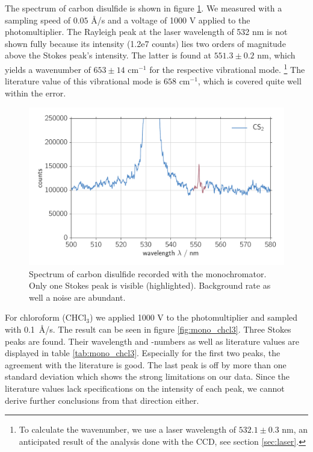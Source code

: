 The spectrum of carbon disulfide is shown in figure \ref{fig:mono_cs2}. We measured with a sampling speed of 
$0.05$ \AA/s and a voltage of 1000 V applied to the photomultiplier. 
The Rayleigh peak at the laser wavelength of 532 nm is not shown fully because its intensity (1.2e7 counts) 
lies two orders of magnitude above the Stokes peak's intensity.
The latter is found at $551.3 \pm 0.2$ nm, which yields a wavenumber of $653 \pm 14 \text{ cm}^{-1}$ for the respective
vibrational mode.%
\footnote{
    To calculate the wavenumber, we use a laser wavelength of $532.1 \pm 0.3$ nm, an anticipated result of the analysis
    done with the CCD, see section \ref{sec:laser}.
} The literature value of this vibrational mode is $658 \text{ cm}^{-1}$, which is covered quite well within the error.   

\begin{figure}[htpb]
    \centering
    \includegraphics[width=0.8\linewidth]{analysis/figures/mono_cs2}
    \caption{Spectrum of carbon disulfide recorded with the monochromator. Only one Stokes peak is visible (highlighted).
    Background rate as well a noise are abundant. }
    \label{fig:mono_cs2}
\end{figure}


For chloroform (CHCl$_3$) we applied 1000 V to the photomultiplier and sampled with 0.1~\AA/s. The result can be seen in 
figure \ref{fig:mono_chcl3}. Three Stokes peaks are found. Their wavelength and -numbers as well as literature values are 
displayed in table \ref{tab:mono_chcl3}. Especially for the first two peaks, the agreement with the literature is good. 
The last peak is off by more than one standard deviation which shows the strong limitations on our data. Since the 
literature values lack specifications on the intensity of each peak, we cannot derive further conclusions from that
direction either. 

